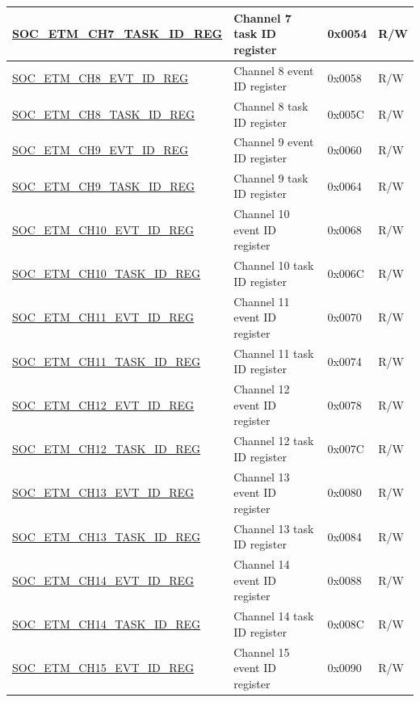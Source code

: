 \begin{longtable}{ | p{6cm} | p{6.2cm} | p{1.3cm} | p{2cm} | }
\hyperref[regdesc:SOCETMCHNTASKIDREG]{SOC\_ETM\_CH7\_TASK\_ID\_REG} & Channel 7 task ID register & 0x0054 & R/W \\ \hline
\hyperref[regdesc:SOCETMCHNEVTIDREG]{SOC\_ETM\_CH8\_EVT\_ID\_REG} & Channel 8 event ID register & 0x0058 & R/W \\ \hline
\hyperref[regdesc:SOCETMCHNTASKIDREG]{SOC\_ETM\_CH8\_TASK\_ID\_REG} & Channel 8 task ID register & 0x005C & R/W \\ \hline
\hyperref[regdesc:SOCETMCHNEVTIDREG]{SOC\_ETM\_CH9\_EVT\_ID\_REG} & Channel 9 event ID register & 0x0060 & R/W \\ \hline
\hyperref[regdesc:SOCETMCHNTASKIDREG]{SOC\_ETM\_CH9\_TASK\_ID\_REG} & Channel 9 task ID register & 0x0064 & R/W \\ \hline
\hyperref[regdesc:SOCETMCHNEVTIDREG]{SOC\_ETM\_CH10\_EVT\_ID\_REG} & Channel 10 event ID register & 0x0068 & R/W \\ \hline
\hyperref[regdesc:SOCETMCHNTASKIDREG]{SOC\_ETM\_CH10\_TASK\_ID\_REG} & Channel 10 task ID register & 0x006C & R/W \\ \hline
\hyperref[regdesc:SOCETMCHNEVTIDREG]{SOC\_ETM\_CH11\_EVT\_ID\_REG} & Channel 11 event ID register & 0x0070 & R/W \\ \hline
\hyperref[regdesc:SOCETMCHNTASKIDREG]{SOC\_ETM\_CH11\_TASK\_ID\_REG} & Channel 11 task ID register & 0x0074 & R/W \\ \hline
\hyperref[regdesc:SOCETMCHNEVTIDREG]{SOC\_ETM\_CH12\_EVT\_ID\_REG} & Channel 12 event ID register & 0x0078 & R/W \\ \hline
\hyperref[regdesc:SOCETMCHNTASKIDREG]{SOC\_ETM\_CH12\_TASK\_ID\_REG} & Channel 12 task ID register & 0x007C & R/W \\ \hline
\hyperref[regdesc:SOCETMCHNEVTIDREG]{SOC\_ETM\_CH13\_EVT\_ID\_REG} & Channel 13 event ID register & 0x0080 & R/W \\ \hline
\hyperref[regdesc:SOCETMCHNTASKIDREG]{SOC\_ETM\_CH13\_TASK\_ID\_REG} & Channel 13 task ID register & 0x0084 & R/W \\ \hline
\hyperref[regdesc:SOCETMCHNEVTIDREG]{SOC\_ETM\_CH14\_EVT\_ID\_REG} & Channel 14 event ID register & 0x0088 & R/W \\ \hline
\hyperref[regdesc:SOCETMCHNTASKIDREG]{SOC\_ETM\_CH14\_TASK\_ID\_REG} & Channel 14 task ID register & 0x008C & R/W \\ \hline
\hyperref[regdesc:SOCETMCHNEVTIDREG]{SOC\_ETM\_CH15\_EVT\_ID\_REG} & Channel 15 event ID register & 0x0090 & R/W \\ \hline

\end{longtable}
